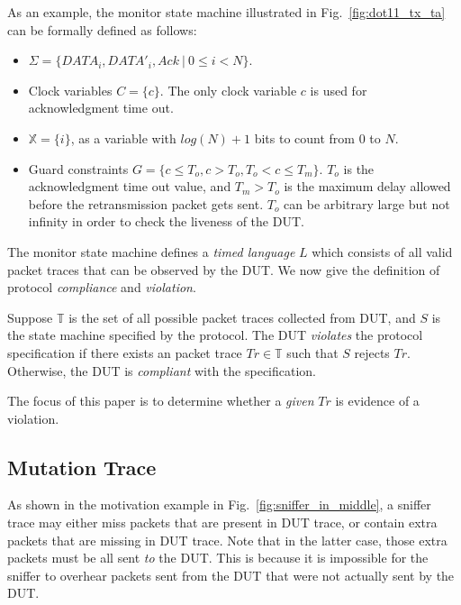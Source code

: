As an example, the monitor state machine illustrated in
Fig.~\ref{fig:dot11_tx_ta} can be formally defined as follows:

\begin{itemize}
  \item $\Sigma = \{DATA_i, DATA'_i, Ack\ |\ 0 \le i < N\}$.
  \item Clock variables $C = \{c\}$. The only clock variable $c$ is
    used for acknowledgment time out.
  \item $\mathbb{X} = \{i\}$, as a variable with ${\mathit log}(N) + 1$ bits to
    count from $0$ to $N$.  
  \item Guard constraints $G = \{ c \le T_o, c > T_o, T_o < c \le T_m\}$.
    $T_o$ is the acknowledgment time out value, and $T_m >
    T_o$ is the maximum delay allowed before the retransmission packet gets
    sent. $T_o$ can be arbitrary large but not infinity in order to check the
    liveness of the DUT.
\end{itemize}


The monitor state machine defines a \textit{timed language} $L$ which consists
of all valid packet traces that can be observed by the DUT.  We now give the
definition of protocol \textit{compliance} and \textit{violation}.

\begin{definition}
  Suppose $\mathbb{T}$ is the set of all possible packet traces collected from
  DUT, and $S$ is the state machine specified by the protocol. The DUT
  \textit{violates} the protocol specification if there exists an
  packet trace $Tr \in \mathbb{T}$ such that $S$ rejects $Tr$.
  Otherwise, the DUT is \textit{compliant} with the specification.
\end{definition}

The focus of this paper is to determine whether a \textit{given} $Tr$ is
evidence of a violation.
%


\subsection{Mutation Trace}
\label{subsec:mutation}

As shown in the motivation example in Fig.~\ref{fig:sniffer_in_middle}, a
sniffer trace may either miss packets that are present in DUT trace, or contain
extra packets that are missing in DUT trace. Note that in the latter case, those
extra packets must be all sent \textit{to} the DUT. This is because it is
impossible for the sniffer to overhear packets sent from the DUT that were not
actually sent by the DUT.


